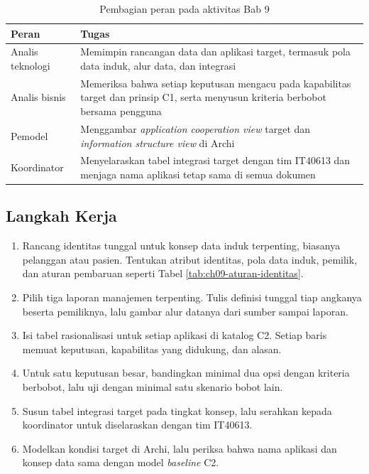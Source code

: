\begin{table}[!htb]
  \centering
  \caption{Pembagian peran pada aktivitas Bab 9}
  \label{tab:ch09-peran}
  \small
  \begin{tabularx}{\textwidth}{lX}
    \hline
    \textbf{Peran} & \textbf{Tugas} \\
    \hline
    Analis teknologi & Memimpin rancangan data dan aplikasi target, termasuk pola data induk, alur data, dan integrasi \\
    \hline
    Analis bisnis & Memeriksa bahwa setiap keputusan mengacu pada kapabilitas target dan prinsip C1, serta menyusun kriteria berbobot bersama pengguna \\
    \hline
    Pemodel & Menggambar \textit{application cooperation view} target dan \textit{information structure view} di Archi \\
    \hline
    Koordinator & Menyelaraskan tabel integrasi target dengan tim IT40613 dan menjaga nama aplikasi tetap sama di semua dokumen \\
    \hline
  \end{tabularx}
\end{table}

\subsection*{Langkah Kerja}

\begin{enumerate}
  \item Rancang identitas tunggal untuk konsep data induk terpenting,
        biasanya pelanggan atau pasien. Tentukan atribut identitas, pola data
        induk, pemilik, dan aturan pembaruan seperti Tabel
        \ref{tab:ch09-aturan-identitas}.
  \item Pilih tiga laporan manajemen terpenting. Tulis definisi tunggal tiap
        angkanya beserta pemiliknya, lalu gambar alur datanya dari sumber
        sampai laporan.
  \item Isi tabel rasionalisasi untuk setiap aplikasi di katalog C2. Setiap
        baris memuat keputusan, kapabilitas yang didukung, dan alasan.
  \item Untuk satu keputusan besar, bandingkan minimal dua opsi dengan
        kriteria berbobot, lalu uji dengan minimal satu skenario bobot lain.
  \item Susun tabel integrasi target pada tingkat konsep, lalu serahkan
        kepada koordinator untuk diselaraskan dengan tim IT40613.
  \item Modelkan kondisi target di Archi, lalu periksa bahwa nama aplikasi
        dan konsep data sama dengan model \textit{baseline} C2.
\end{enumerate}

